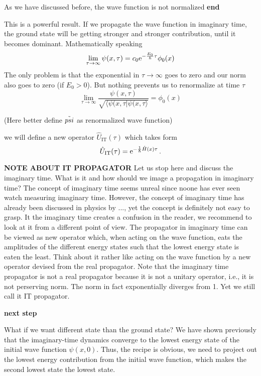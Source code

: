 As we have discussed before, the wave function is not normalized
\textbf{end}

This is a powerful result. If we propagate the wave function in imaginary time, the ground state will be getting stronger and stronger contribution, until it becomes dominant. Mathematically speaking
\begin{equation}
    \lim_{\tau\to\infty} \psi(x,\tau) = c_0 \mathrm{e}^{-\frac{E_0}{\hbar}\tau} \phi_0(x)
\end{equation}
The only problem is that the exponential in $\tau\to\infty$ goes to zero and our norm also goes to zero (if $E_0 > 0$). But nothing prevents us to renormalize at time $\tau$
\begin{equation}
    \lim_{\tau\to\infty} \frac{\psi(x,\tau)}{\sqrt{\langle\psi(x,\tau | \psi(x,\tau \rangle}} = \phi_0(x)
\end{equation}

(Here better define $\Tilde{psi}$ as renormalized wave function)

\vspace{2cm}
we will define a new operator $\hat{U}_\mathrm{IT}(\tau)$ which takes form
\begin{equation}
    \hat{U}_\mathrm{IT}(\tau) = \mathrm{e}^{-\frac{1}{\hbar}\hat{H}(x)\tau} \, .
\end{equation}


\textbf{NOTE ABOUT IT PROPAGATOR}
Let us stop here and discuss the imaginary time. What is it and how should we image a propagation in imaginary time? The concept of imaginary time seems unreal since noone has ever seen watch measuring imaginary time. However, the concept of imaginary time has already been discussed in physics by ..., yet the concept is definitely not easy to grasp. It the imaginary time creates a confusion in the reader, we recommend to look at it from a different point of view. The propagator in imaginary time can be viewed as new operator which, when acting on the wave function, eats the amplitudes of the different energy states such that the lowest energy state is eaten the least. Think about it rather like acting on the wave function by a new operator devised from the real propagator. Note that the imaginary time propagator is not a real propagator because it is not a unitary operator, i.e., it is not perserving norm. The norm in fact exponentially diverges from 1. Yet we still call it IT propagator.

\textbf{next step}

What if we want  different state than the ground state? We have shown previously that the imaginary-time dynamics  converge to the lowest energy state of the initial wave function $\psi(x,0)$.
Thus, the recipe is obvious, we need to project out the lowest energy contribution from the initial wave function, which makes the second lowest state the lowest state.

